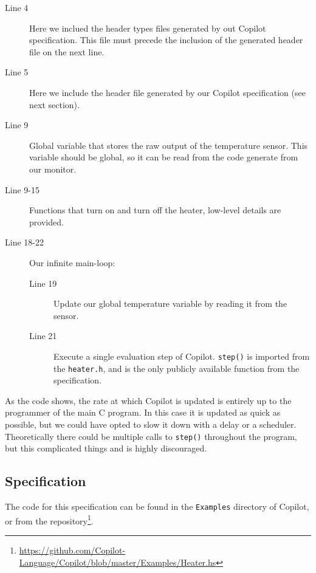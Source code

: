 \begin{description}
  \item[Line 4] Here we inclued the header types files generated by out Copilot
  specification. This file must precede the inclusion of the generated header
  file on the next line. 
  \item[Line 5] Here we include the header file generated by our Copilot
  specification (see next section).
  \item[Line 9] Global variable that stores the raw output of the temperature
  sensor. This variable should be global, so it can be read from the code
  generate from our monitor.
  \item[Line 9-15] Functions that turn on and turn off the
  heater, low-level details are provided.
  \item[Line 18-22] Our infinite main-loop:
    \begin{description}
      \item[Line 19] Update our global temperature variable by reading it from
      the sensor.
      \item[Line 21] Execute a single evaluation step of Copilot.
      \texttt{step()} is imported from the \texttt{heater.h}, and is the only
      publicly available function from the specification.
    \end{description}
\end{description}

As the code shows, the rate at which Copilot is updated is entirely up to the
programmer of the main C program. In this case it is updated as quick as
possible, but we could have opted to slow it down with a delay or a scheduler.
Theoretically there could be multiple calls to \texttt{step()} throughout the
program, but this complicated things and is highly discouraged.


\subsection{Specification}
The code for this specification can be found in the \texttt{Examples} directory
of Copilot, or from the
repository\footnote{\url{https://github.com/Copilot-Language/Copilot/blob/master/Examples/Heater.hs}}.

